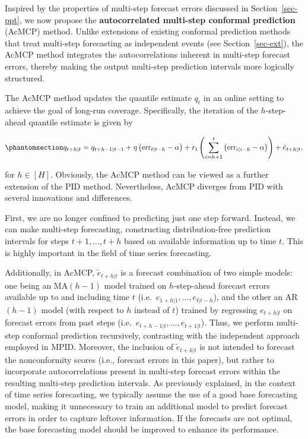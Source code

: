\documentclass[
  11pt,
  a4paper,
]{article}
\theoremstyle{plain}
\theoremstyle{plain}
\theoremstyle{remark}
\begin{document}
Inspired by the properties of multi-step forecast errors discussed in
Section~\ref{sec-ppt}, we now propose the \textbf{autocorrelated
multi-step conformal prediction} (AcMCP) method. Unlike extensions of
existing conformal prediction methods that treat multi-step forecasting
as independent events (see Section~\ref{sec-ext}), the AcMCP method
integrates the autocorrelations inherent in multi-step forecast errors,
thereby making the output multi-step prediction intervals more logically
structured.

The AcMCP method updates the quantile estimate \(q_t\) in an online
setting to achieve the goal of long-run coverage. Specifically, the
iteration of the \(h\)-step-ahead quantile estimate is given by

\begin{equation}\phantomsection\label{eq-acmcp}{
q_{t+h|t}=q_{t+h-1|t-1}+\eta \left(\mathrm{err}_{t|t-h}-\alpha\right)+r_t\left(\sum_{i=h+1}^t \left(\mathrm{err}_{i|i-h}-\alpha\right)\right)+\tilde{e}_{t+h|t},
}\end{equation}

for \(h\in[H]\). Obviously, the AcMCP method can be viewed as a further
extension of the PID method. Nevertheless, AcMCP diverges from PID with
several innovations and differences.

First, we are no longer confined to predicting just one step forward.
Instead, we can make multi-step forecasting, constructing
distribution-free prediction intervals for steps \(t+1,\ldots,t+h\)
based on available information up to time \(t\). This is highly
important in the field of time series forecasting.

Additionally, in AcMCP, \(\tilde{e}_{t+h|t}\) is a forecast combination
of two simple models: one being an MA\((h-1)\) model trained on
\(h\)-step-ahead forecast errors available up to and including time
\(t\) (i.e.~\(e_{1+h|1}, \ldots, e_{t|t-h}\)), and the other an
AR\((h-1)\) model (with respect to \(h\) instead of \(t\)) trained by
regressing \(e_{t+h|t}\) on forecast errors from past steps
(i.e.~\(e_{t+h-1|t}, \ldots, e_{t+1|t}\)). Thus, we perform multi-step
conformal prediction recursively, contrasting with the independent
approach employed in MPID. Moreover, the inclusion of
\(\tilde{e}_{t+h|t}\) is not intended to forecast the nonconformity
scores (i.e., forecast errors in this paper), but rather to incorporate
autocorrelations present in multi-step forecast errors within the
resulting multi-step prediction intervals. As previously explained, in
the context of time series forecasting, we typically assume the use of a
good base forecasting model, making it unnecessary to train an
additional model to predict forecast errors in order to capture leftover
information. If the forecasts are not optimal, the base forecasting
model should be improved to enhance its performance.
\end{document}
